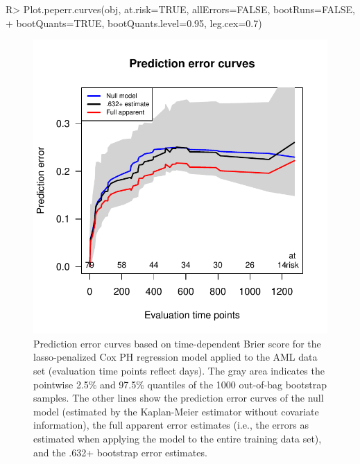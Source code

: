 \documentclass[nojss]{jss}
\begin{document}
\begin{Schunk}
\begin{Sinput}
R> Plot.peperr.curves(obj, at.risk=TRUE, allErrors=FALSE, bootRuns=FALSE,
+                     bootQuants=TRUE, bootQuants.level=0.95, leg.cex=0.7)
\end{Sinput}
\end{Schunk}
\begin{figure}[t!]
\begin{center}
\includegraphics{c060_vignette-peperrPlot2}
\end{center}
\caption{Prediction error curves based on time-dependent Brier score for the lasso-penalized Cox PH regression model applied to the AML data set (evaluation time points reflect days). The gray area indicates the pointwise 2.5\% and 97.5\% quantiles of the 1000 out-of-bag bootstrap samples. The other lines show the prediction error curves of the null model (estimated by the Kaplan-Meier estimator without covariate information), the full apparent error estimates (i.e., the errors as estimated when applying the model to the entire training data set), and the .632+ bootstrap error estimates.}
\label{fig:pec}
\end{figure}
\end{document}
